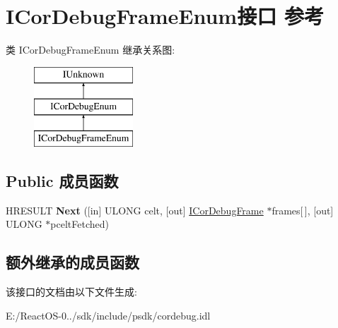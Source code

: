 \hypertarget{interface_i_cor_debug_frame_enum}{}\section{I\+Cor\+Debug\+Frame\+Enum接口 参考}
\label{interface_i_cor_debug_frame_enum}
类 I\+Cor\+Debug\+Frame\+Enum 继承关系图\+:\begin{figure}[H]
\begin{center}
\leavevmode
\includegraphics[height=3.000000cm]{interface_i_cor_debug_frame_enum}
\end{center}
\end{figure}
\subsection*{Public 成员函数}
\begin{DoxyCompactItemize}
\item 
\mbox{\label{interface_i_cor_debug_frame_enum_ade0d85f452dbb22d5b153548fbec676c}} 
H\+R\+E\+S\+U\+LT {\bfseries Next} (\mbox{[}in\mbox{]} U\+L\+O\+NG celt, \mbox{[}out\mbox{]} \hyperlink{interface_i_cor_debug_frame}{I\+Cor\+Debug\+Frame} $\ast$frames\mbox{[}$\,$\mbox{]}, \mbox{[}out\mbox{]} U\+L\+O\+NG $\ast$pcelt\+Fetched)
\end{DoxyCompactItemize}
\subsection*{额外继承的成员函数}


该接口的文档由以下文件生成\+:\begin{DoxyCompactItemize}
\item 
E\+:/\+React\+O\+S-\/0../sdk/include/psdk/cordebug.\+idl\end{DoxyCompactItemize}
